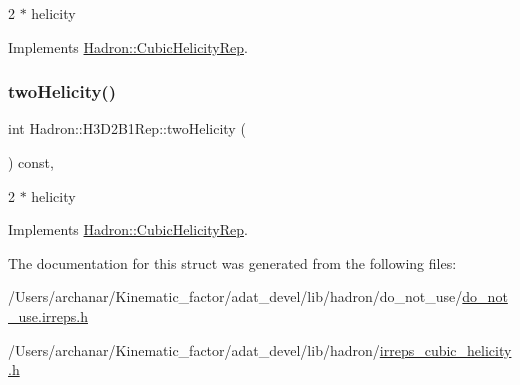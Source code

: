 2 $\ast$ helicity 

Implements \mbox{\hyperlink{structHadron_1_1CubicHelicityRep_af507aa56fc2747eacc8cb6c96db31ecc}{Hadron\+::\+Cubic\+Helicity\+Rep}}.

\mbox{\label{structHadron_1_1H3D2B1Rep_aac44e59a958d39120aa886dafe262b7d}} 
\subsubsection{\texorpdfstring{twoHelicity()}{twoHelicity()}\hspace{0.1cm}{\footnotesize\ttfamily [2/2]}}
{\footnotesize\ttfamily int Hadron\+::\+H3\+D2\+B1\+Rep\+::two\+Helicity (\begin{DoxyParamCaption}{ }\end{DoxyParamCaption}) const\hspace{0.3cm}{\ttfamily [inline]}, {\ttfamily [virtual]}}

2 $\ast$ helicity 

Implements \mbox{\hyperlink{structHadron_1_1CubicHelicityRep_af507aa56fc2747eacc8cb6c96db31ecc}{Hadron\+::\+Cubic\+Helicity\+Rep}}.



The documentation for this struct was generated from the following files\+:\begin{DoxyCompactItemize}
\item 
/\+Users/archanar/\+Kinematic\+\_\+factor/adat\+\_\+devel/lib/hadron/do\+\_\+not\+\_\+use/\mbox{\hyperlink{do__not__use_8irreps_8h}{do\+\_\+not\+\_\+use.\+irreps.\+h}}\item 
/\+Users/archanar/\+Kinematic\+\_\+factor/adat\+\_\+devel/lib/hadron/\mbox{\hyperlink{lib_2hadron_2irreps__cubic__helicity_8h}{irreps\+\_\+cubic\+\_\+helicity.\+h}}\end{DoxyCompactItemize}
